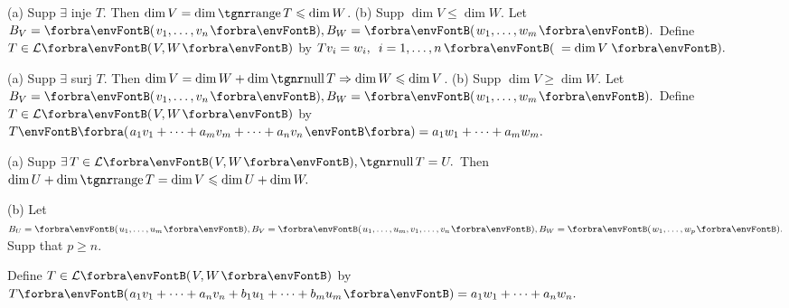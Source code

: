 (a) Supp $\exists$ inje $T$. Then $\dim V=\dim\range T\leqslant\dim W$.\parSol{}
(b) Supp $\dim V\leqslant\dim W.$ Let $B_V=\Par{v_1,\dots,v_n},B_W=\Par{w_1,\dots,w_m}.$\parSol{\Hb}
Define $T\in\Lm{V,W}$ by $Tv_i=w_i,\,\,\,i=1,\dots,n\,\Par{\,=\dim V\,}.$\PfEnd
\SepLine

(a) Supp $\exists$ surj $T$. Then $\dim V=\dim W+\dim\null T\Rightarrow\dim W\leqslant\dim V$.\parSol{}
(b) Supp $\dim V\geqslant\dim W.$ Let $B_V=\Par{v_1,\dots,v_n},B_W=\Par{w_1,\dots,w_m}.$\parSol{\Hb}
Define $T\in\Lm{V,W}$ by $T\BigPar{a_1 v_1+\dots+a_m v_m+\dots+a_n v_n}=a_1 w_1+\dots+a_m w_m.$\PfEnd
\SepLine

\par\quad
(a) Supp $\exists\,T\in\Lm{V,W},\null T=U.$ Then $\dim U+\dim\range T=\dim V\leqslant\dim U+\dim W.$\par\quad
(b) Let $B_U=\Par{u_1,\dots,u_m},B_V=\Par{u_1,\dots,u_m,v_1,\dots,v_n},B_W=\Par{w_1,\dots,w_p}.$ Supp that $p\geqslant n.$\par\quad\Hb
Define $T\in\Lm{V,W}$ by $T\Par{a_1 v_1+\dots+a_n v_n+b_1 u_1+\dots+b_m u_m}=a_1 w_1+\dots+a_n w_n.$\PfEnd
\SepLine\pagebreak


